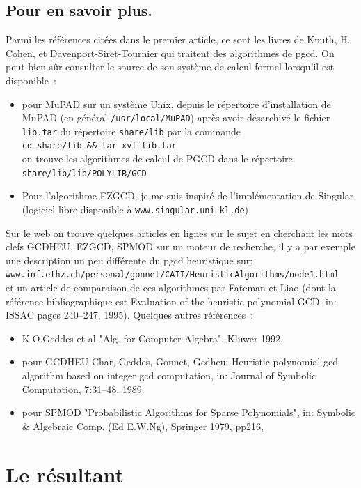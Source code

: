 \documentclass[a4paper,11pt]{article}
\begin{document}
\begin{giacjshere}
\subsection{Pour en savoir plus.}
Parmi les références citées dans le premier article, ce sont les livres de
Knuth, H. Cohen, et Davenport-Siret-Tournier qui traitent des algorithmes de
pgcd. On peut bien sûr consulter le source de son système de calcul formel
lorsqu'il est disponible~:
\begin{itemize}
\item pour MuPAD sur un système Unix, depuis le
répertoire d'installation de MuPAD (en général {\tt /usr/local/MuPAD})
après avoir désarchivé le fichier {\tt lib.tar} du répertoire {\tt share/lib} 
par la commande \\{\tt cd share/lib \&\& tar xvf lib.tar}\\ 
on trouve les  algorithmes de calcul de PGCD dans le répertoire \\
{\tt share/lib/lib/POLYLIB/GCD}
\item Pour l'algorithme EZGCD, je me suis inspiré de l'implémentation de 
Singular (logiciel libre disponible à {\tt www.singular.uni-kl.de})
\end{itemize}
Sur le web on trouve quelques articles en lignes sur le
sujet en cherchant les mots clefs GCDHEU, EZGCD, SPMOD sur un moteur de 
recherche, il y a par exemple une description un peu différente du pgcd
heuristique sur:\\
{\tt www.inf.ethz.ch/personal/gonnet/CAII/HeuristicAlgorithms/node1.html}\\
et un article de comparaison de ces algorithmes 
par Fateman et Liao (dont la référence bibliographique est
Evaluation of the heuristic polynomial GCD.
in: ISSAC pages 240--247, 1995). Quelques autres références~:
\begin{itemize}
\item K.O.Geddes et al "Alg. for Computer Algebra", Kluwer 1992.
\item pour GCDHEU Char, Geddes, Gonnet, 
Gcdheu: Heuristic polynomial gcd algorithm based on integer gcd computation,
in: Journal of Symbolic Computation, 7:31--48, 1989.
\item pour SPMOD "Probabilistic Algorithms for Sparse Polynomials",
in: Symbolic \& Algebraic Comp. (Ed E.W.Ng), Springer 1979, pp216,
\end{itemize}


\section{Le résultant} \label{sec:resultant} 

\end{giacjshere}
\end{document}
